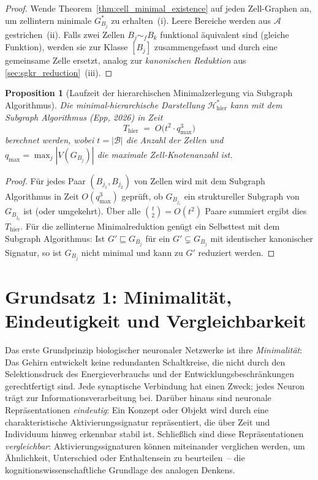﻿\documentclass[12pt, a4paper, openany]{report}
\newtheorem{proposition}[theorem]{Proposition}
\newcommand{\calH}{\mathcal{H}}
\newcommand{\calA}{\mathcal{A}}
\newcommand{\calB}{\mathcal{B}}
\begin{document}
\begin{proof}
Wende Theorem~\ref{thm:cell_minimal_existence} auf jeden Zell-Graphen an,
um zellintern minimale $G^*_{B_j}$ zu erhalten~(i).  Leere Bereiche werden
aus $\calA$ gestrichen~(ii).  Falls zwei Zellen $B_j \sim_f B_k$ funktional
äquivalent sind (gleiche Funktion), werden sie zur Klasse $[B_j]$ zusammengefasst
und durch eine gemeinsame Zelle ersetzt, analog zur \emph{kanonischen Reduktion}
aus \cref{sec:sgkr_reduction}~(iii).
\end{proof}

\begin{proposition}[Laufzeit der hierarchischen Minimalzerlegung via Subgraph Algorithmus]
\label{prop:hierarchy_runtime}
Die minimal-hierarchische Darstellung $\calH^*_{\mathrm{hier}}$ kann mit dem
Subgraph Algorithmus (Epp, 2026) in Zeit
\[
  T_{\mathrm{hier}}
  \;=\;
  O\!\bigl(t^2 \cdot q_{\max}^3\bigr)
\]
berechnet werden, wobei $t = |\calB|$ die Anzahl der Zellen und
$q_{\max} = \max_j |V(G_{B_j})|$ die maximale Zell-Knotenanzahl ist.
\end{proposition}

\begin{proof}
Für jedes Paar $(B_{j_1}, B_{j_2})$ von Zellen wird mit dem Subgraph
Algorithmus in Zeit $O(q_{\max}^3)$ geprüft, ob $G_{B_{j_1}}$ ein
struktureller Subgraph von $G_{B_{j_2}}$ ist (oder umgekehrt).  Über alle
$\binom{t}{2} = O(t^2)$ Paare summiert ergibt dies $T_{\mathrm{hier}}$.
Für die zellinterne Minimalreduktion genügt ein Selbsttest mit dem
Subgraph Algorithmus: Ist $G' \sqsubseteq G_{B_j}$ für ein $G' \subsetneq G_{B_j}$
mit identischer kanonischer Signatur, so ist $G_{B_j}$ nicht minimal und
kann zu $G'$ reduziert werden.
\end{proof}

\section{Grundsatz 1: Minimalität, Eindeutigkeit und Vergleichbarkeit}
\label{sec:bio_minimal}

Das erste Grundprinzip biologischer neuronaler Netzwerke ist ihre
\emph{Minimalität}: Das Gehirn entwickelt keine redundanten Schaltkreise,
die nicht durch den Selektionsdruck des Energieverbrauchs und der
Entwicklungsbeschränkungen gerechtfertigt sind.  Jede synaptische Verbindung
hat einen Zweck; jedes Neuron trägt zur Informationsverarbeitung bei.  Darüber
hinaus sind neuronale Repräsentationen \emph{eindeutig}: Ein Konzept oder Objekt
wird durch eine charakteristische Aktivierungssignatur repräsentiert, die
über Zeit und Individuum hinweg erkennbar stabil ist.  Schließlich sind diese
Repräsentationen \emph{vergleichbar}: Aktivierungssignaturen können
miteinander verglichen werden, um Ähnlichkeit, Unterschied oder
Enthaltensein zu beurteilen~-- die kognitionswissenschaftliche Grundlage
des analogen Denkens.
\end{document}
